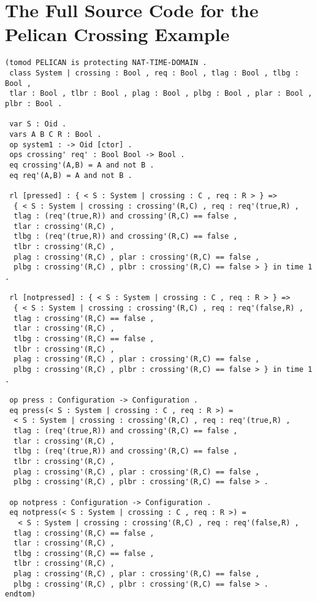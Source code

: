 \documentclass[a4paper,11pt]{report}
\begin{document}
\chapter{The Full Source Code for the Pelican Crossing Example}
\label{chap:apc}
\begin{verbatim}
(tomod PELICAN is protecting NAT-TIME-DOMAIN .
 class System | crossing : Bool , req : Bool , tlag : Bool , tlbg : Bool , 
 tlar : Bool , tlbr : Bool , plag : Bool , plbg : Bool , plar : Bool , plbr : Bool .

 var S : Oid .
 vars A B C R : Bool .
 op system1 : -> Oid [ctor] .
 ops crossing' req' : Bool Bool -> Bool .
 eq crossing'(A,B) = A and not B .
 eq req'(A,B) = A and not B .

 rl [pressed] : { < S : System | crossing : C , req : R > } => 
  { < S : System | crossing : crossing'(R,C) , req : req'(true,R) , 
  tlag : (req'(true,R)) and crossing'(R,C) == false ,
  tlar : crossing'(R,C) ,
  tlbg : (req'(true,R)) and crossing'(R,C) == false , 
  tlbr : crossing'(R,C) ,
  plag : crossing'(R,C) , plar : crossing'(R,C) == false ,
  plbg : crossing'(R,C) , plbr : crossing'(R,C) == false > } in time 1 .

 rl [notpressed] : { < S : System | crossing : C , req : R > } => 
  { < S : System | crossing : crossing'(R,C) , req : req'(false,R) , 
  tlag : crossing'(R,C) == false ,
  tlar : crossing'(R,C) ,
  tlbg : crossing'(R,C) == false , 
  tlbr : crossing'(R,C) ,
  plag : crossing'(R,C) , plar : crossing'(R,C) == false ,
  plbg : crossing'(R,C) , plbr : crossing'(R,C) == false > } in time 1 .

 op press : Configuration -> Configuration .
 eq press(< S : System | crossing : C , req : R >) = 
  < S : System | crossing : crossing'(R,C) , req : req'(true,R) , 
  tlag : (req'(true,R)) and crossing'(R,C) == false ,
  tlar : crossing'(R,C) ,
  tlbg : (req'(true,R)) and crossing'(R,C) == false , 
  tlbr : crossing'(R,C) ,
  plag : crossing'(R,C) , plar : crossing'(R,C) == false ,
  plbg : crossing'(R,C) , plbr : crossing'(R,C) == false > .

 op notpress : Configuration -> Configuration .
 eq notpress(< S : System | crossing : C , req : R >) = 
   < S : System | crossing : crossing'(R,C) , req : req'(false,R) , 
  tlag : crossing'(R,C) == false ,
  tlar : crossing'(R,C) ,
  tlbg : crossing'(R,C) == false , 
  tlbr : crossing'(R,C) ,
  plag : crossing'(R,C) , plar : crossing'(R,C) == false ,
  plbg : crossing'(R,C) , plbr : crossing'(R,C) == false > .
endtom)


\end{verbatim}
\end{document}

